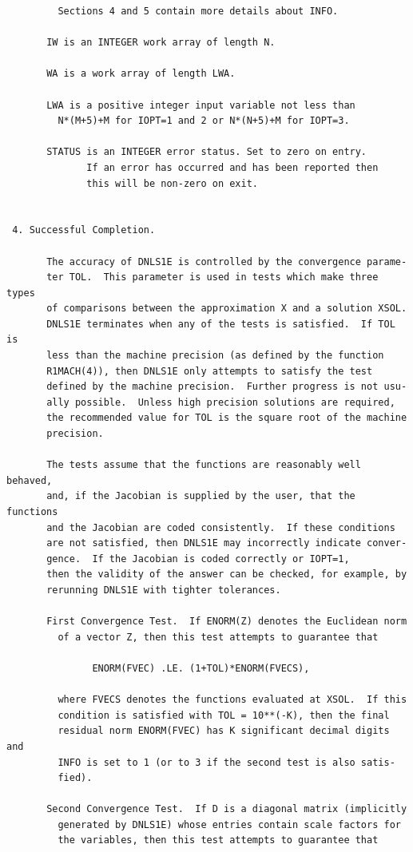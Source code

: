 \documentclass[11pt,twoside]{article}
\begin{document}
\begin{verbatim}
         Sections 4 and 5 contain more details about INFO.

       IW is an INTEGER work array of length N.

       WA is a work array of length LWA.

       LWA is a positive integer input variable not less than
         N*(M+5)+M for IOPT=1 and 2 or N*(N+5)+M for IOPT=3.

       STATUS is an INTEGER error status. Set to zero on entry.
              If an error has occurred and has been reported then
              this will be non-zero on exit.


 4. Successful Completion.

       The accuracy of DNLS1E is controlled by the convergence parame-
       ter TOL.  This parameter is used in tests which make three types
       of comparisons between the approximation X and a solution XSOL.
       DNLS1E terminates when any of the tests is satisfied.  If TOL is
       less than the machine precision (as defined by the function
       R1MACH(4)), then DNLS1E only attempts to satisfy the test
       defined by the machine precision.  Further progress is not usu-
       ally possible.  Unless high precision solutions are required,
       the recommended value for TOL is the square root of the machine
       precision.

       The tests assume that the functions are reasonably well behaved,
       and, if the Jacobian is supplied by the user, that the functions
       and the Jacobian are coded consistently.  If these conditions
       are not satisfied, then DNLS1E may incorrectly indicate conver-
       gence.  If the Jacobian is coded correctly or IOPT=1,
       then the validity of the answer can be checked, for example, by
       rerunning DNLS1E with tighter tolerances.

       First Convergence Test.  If ENORM(Z) denotes the Euclidean norm
         of a vector Z, then this test attempts to guarantee that

               ENORM(FVEC) .LE. (1+TOL)*ENORM(FVECS),

         where FVECS denotes the functions evaluated at XSOL.  If this
         condition is satisfied with TOL = 10**(-K), then the final
         residual norm ENORM(FVEC) has K significant decimal digits and
         INFO is set to 1 (or to 3 if the second test is also satis-
         fied).

       Second Convergence Test.  If D is a diagonal matrix (implicitly
         generated by DNLS1E) whose entries contain scale factors for
         the variables, then this test attempts to guarantee that


\end{verbatim}
\end{document}
